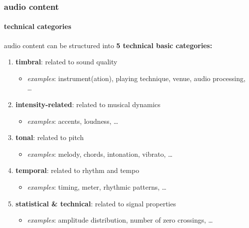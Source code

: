         \begin{frame}\frametitle{audio content}\framesubtitle{technical categories}
            audio content can be structured into \textbf{5 technical basic categories:}
            
            \bigskip
            \begin{enumerate}
                \item<2->	\textbf{timbral}: related to sound quality
                    \begin{itemize}
                        \item   \textit{examples}: instrument(ation), playing technique, venue, audio processing, \ldots
                    \end{itemize}
                        \smallskip
                \item<3->	\textbf{intensity-related}: related to musical dynamics
                    \begin{itemize}
                        \item   \textit{examples}: accents, loudness, \ldots
                    \end{itemize}
                        \smallskip
                \item<4->	\textbf{tonal}: related to pitch
                    \begin{itemize}
                        \item   \textit{examples}: melody, chords, intonation, vibrato, \ldots
                    \end{itemize}
                        \smallskip
                \item<5->	\textbf{temporal}: related to rhythm and tempo
                    \begin{itemize}
                        \item   \textit{examples}: timing, meter, rhythmic patterns, \ldots
                    \end{itemize}
                        \smallskip
                \item<6->	\textbf{statistical \& technical}: related to signal properties
                    \begin{itemize}
                        \item   \textit{examples}: amplitude distribution, number of zero crossings, \ldots
                    \end{itemize}
            \end{enumerate}
        \end{frame}

